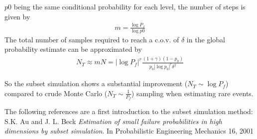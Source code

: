 {
$p0$ being the same conditional probability for each level, the number of steps is given by 
\begin{eqnarray*}
   m = \frac{\log P_f}{\log p0}
\end{eqnarray*}
The total number of samples required to reach a c.o.v. of $\delta$ in the global probability estimate can be approximated by
\begin{eqnarray*}
  N_T \approx m N = |\log P_f|^r \frac{(1+\gamma)(1-p_0)}{p_0|\log p_0|^r \delta^2}
\end{eqnarray*}

So the subset simulation shows a substantial improvement ($N_T \sim \log P_f$) compared to crude Monte Carlo ($N_T \sim \frac{1}{P_f}$) sampling when estimating rare events.

\vspace{10mm}
The following references are a first introduction to the subset simulation method:\\

\label{ab01} S.K. Au and J. L. Beck \textit{Estimation of small failure probabilities in high dimensions by subset simulation}. In Probabilistic Engineering Mechanics 16, 2001

}
